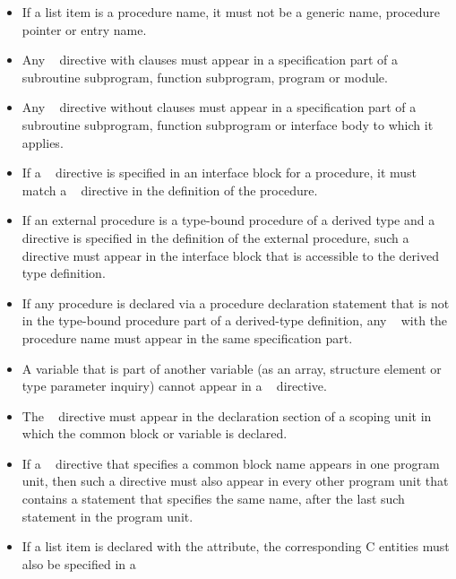 \begin{fortranspecific}
\begin{itemize}
\item If a list item is a procedure name, it must not be a generic name,
      procedure pointer or entry name.
\item Any ~ directive with clauses must appear
      in a specification part of a subroutine subprogram, function subprogram,
      program or module.
\item Any ~ directive without clauses must appear
      in a specification part of a subroutine subprogram, function subprogram
      or interface body to which it applies.
\item If a ~ directive is specified in an
      interface block for a procedure, it must match a
      ~ directive in the definition of the
      procedure.
\item If an external procedure is a type-bound procedure of a derived
      type and a ~ directive is specified in
      the definition of the external procedure, such a directive must
      appear in the interface block that is accessible to the derived
      type definition.
\item If any procedure is declared via a procedure declaration statement
      that is not in the type-bound procedure part of a derived-type
      definition, any ~ with the procedure
      name must appear in the same specification part.
\item A variable that is part of another variable (as an array, structure
      element or type parameter inquiry) cannot appear in a
      ~ directive.
\item The ~ directive must appear in the
      declaration section of a scoping unit in which the common block
      or variable is declared.
\item If a ~ directive that specifies a common
      block name appears in one program unit, then such a directive must
      also appear in every other program unit that contains a 
      statement that specifies the same name, after the last such  
      statement in the program unit.
\item If a list item is declared with the  attribute, the
      corresponding C entities must also be specified in a

\end{itemize}
\end{fortranspecific}
